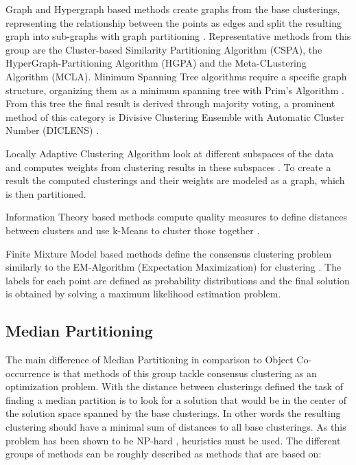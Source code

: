 \documentclass[
	a4paper,
	english,
	twoside,
	openright,               
	11pt                            
	]{report}
\begin{document}
Graph and Hypergraph based methods create graphs from the base clusterings, representing the relationship between the points as edges and split the resulting graph into sub-graphs with graph partitioning \cite{Strehl:2003:CEK:944919.944935}. Representative methods from this group are the Cluster-based Similarity Partitioning Algorithm (CSPA), the HyperGraph-Partitioning Algorithm (HGPA) and the Meta-CLustering Algorithm (MCLA). Minimum Spanning Tree algorithms require a specific graph structure, organizing them as a minimum spanning tree with Prim's Algorithm \cite[p.~276]{10.1007/978-3-540-85033-5_27}. From this tree the final result is derived through majority voting, a prominent method of this category is Divisive Clustering Ensemble with Automatic Cluster Number (DICLENS) \cite{6035671}.

Locally Adaptive Clustering Algorithm look at different subspaces of the data and computes weights from clustering results in these subspaces \cite{Domeniconi2007}. To create a result the computed clusterings and their weights are modeled as a graph, which is then partitioned.

Information Theory based methods compute quality measures to define distances between clusters and use k-Means to cluster those together \cite[p.~353]{survey1}.

Finite Mixture Model based methods define the consensus clustering problem similarly to the EM-Algorithm (Expectation Maximization) for clustering \cite{Goder2008ConsensusCA,Topchy2004AMM}. The labels for each point are defined as  probability distributions and the final solution is obtained by solving a maximum likelihood estimation problem.

\subsection{Median Partitioning}
The main difference of Median Partitioning in comparison to Object Co-occurrence is that methods of this group tackle consensus clustering as an optimization problem. With the distance between clusterings defined the task of finding a median partition is to look for a solution that would be in the center of the solution space spanned by the base clusterings. In other words the resulting clustering should have a minimal sum of distances to all base clusterings. As this problem has been shown to be NP-hard \cite{np_median_partition}, heuristics must be used. The different groups of methods can be roughly described as methods that are based on:
\end{document}
